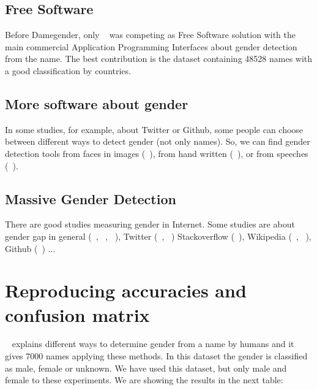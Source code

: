 \documentclass[fleqn,10pt]{wlpeerj} %
\begin{document}
\subsection*{Free Software}

Before Damegender, only ~\cite{krawetz2006gender} was competing as
Free Software solution with the main commercial Application
Programming Interfaces about gender detection from the name. The best
contribution is the dataset containing 48528 names with a good
classification by countries.

\subsection*{More software about gender}

In some studies, for example, about Twitter or Github, some people can
choose between different ways to detect gender (not only names). So,
we can find gender detection tools from faces in images
(~\cite{ranjan2017hyperface}), from hand written
(~\cite{liwicki2011automatic}), or from speeches
(~\cite{koppel2002automatically}).

\subsection*{Massive Gender Detection}

There are good studies measuring gender in Internet. Some studies are
about gender gap in general (~\cite{robles2014floss},
~\cite{holman2018gender}, ~\cite{dollar1999gender}), Twitter
(~\cite{burger2011discriminating}, ~\cite{mislove2011understanding})
Stackoverflow (~\cite{vasilescu2012gender}), Wikipedia
(~\cite{antin2011gender}, ~\cite{hill2013wikipedia}), Github
(~\cite{vasilescu2015gender}) ...

\section*{Reproducing accuracies and confusion matrix}

~\cite{10.7717/peerj-cs.156} explains different ways to determine
gender from a name by humans and it gives 7000 names applying these
methods. In this dataset the gender is classified as male, female or
unknown. We have used this dataset, but only male and female to these
experiments. We are showing the results in the next table:
\end{document}
